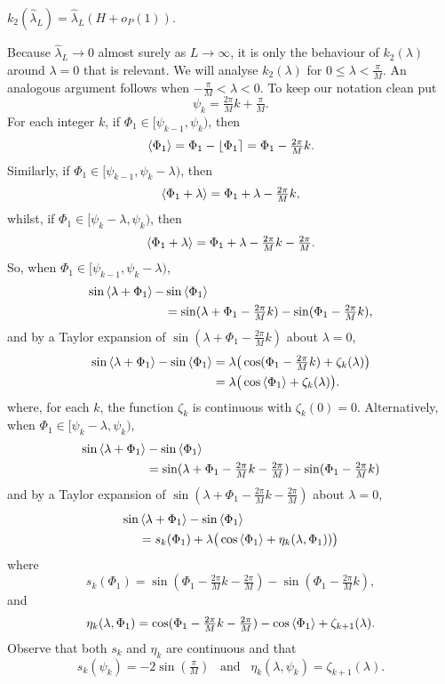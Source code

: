 \documentclass[journal]{IEEEtran}
\begin{document}
\begin{lemma}\label{lem:k2conv}
$k_2(\hat{\lambda}_L) = \hat{\lambda}_L ( H + o_P(1) ).$
\end{lemma}
\begin{IEEEproof}
Because $\hat{\lambda}_L \rightarrow 0$ almost surely as $L\rightarrow\infty$, it is only the behaviour of $k_2(\lambda)$ around $\lambda = 0$ that is relevant.  We will analyse $k_2(\lambda)$ for $0 \leq \lambda < \tfrac{\pi}{M}$.  An analogous argument follows when $-\tfrac{\pi}{M} < \lambda < 0$.  To keep our notation clean put
\[
\psi_k = \tfrac{2\pi}{M}k + \tfrac{\pi}{M}.
\]
For each integer $k$, if $\Phi_1 \in [\psi_{k-1}, \psi_k)$, then
\[
\left\langle \Phi_1 \right\rangle = \Phi_1 - {\left\lfloor \Phi_1 \right\rceil} = \Phi_1 - \tfrac{2\pi}{M}k.
\]
Similarly, if $\Phi_1 \in  [\psi_{k-1}, \psi_{k} - \lambda)$, then
\[
\left\langle \Phi_1 + \lambda \right\rangle = \Phi_1 + \lambda - \tfrac{2\pi}{M}k,
\]
whilst, if $\Phi_1 \in [\psi_{k} - \lambda, \psi_{k})$, then
\[
\left\langle \Phi_1 + \lambda \right\rangle = \Phi_1 + \lambda - \tfrac{2\pi}{M}k - \tfrac{2\pi}{M}.
\]
So, when $\Phi_1 \in [\psi_{k-1}, \psi_{k} - \lambda )$,
\begin{align*}
\sin\left\langle \lambda + \Phi_1 \right\rangle - &\sin\left\langle \Phi_1 \right\rangle \\
&= \sin(\lambda + \Phi_1 - \tfrac{2\pi}{M}k) - \sin(\Phi_1 - \tfrac{2\pi}{M}k),
\end{align*}
and by a Taylor expansion of $\sin(\lambda + \Phi_1 - \tfrac{2\pi}{M}k)$ about $\lambda = 0$, 
\begin{align*}
\sin\left\langle \lambda + \Phi_1 \right\rangle - \sin\left\langle \Phi_1 \right\rangle &= \lambda\big(\cos(\Phi_1 - \tfrac{2\pi}{M}k) + \zeta_k(\lambda)\big) \\
&= \lambda\big(\cos\left\langle \Phi_1 \right\rangle + \zeta_k(\lambda)\big).
\end{align*}
where, for each $k$, the function $\zeta_k$ is continuous with $\zeta_k(0) = 0$.  Alternatively, when $\Phi_1 \in [ \psi_{k} - \lambda,\psi_{k})$,
\begin{align*}
\sin\left\langle \lambda + \Phi_1 \right\rangle &- \sin\left\langle \Phi_1 \right\rangle \\
&= \sin(\lambda + \Phi_1 - \tfrac{2\pi}{M}k - \tfrac{2\pi}{M}) - \sin(\Phi_1 - \tfrac{2\pi}{M}k)
\end{align*}
and by a Taylor expansion of $\sin(\lambda + \Phi_1 - \tfrac{2\pi}{M}k - \tfrac{2\pi}{M})$ about $\lambda = 0$,
\begin{align*}
\sin&\left\langle \lambda + \Phi_1 \right\rangle - \sin\left\langle \Phi_1 \right\rangle \\
&= s_k(\Phi_1) + \lambda\big(\cos\left\langle \Phi_1 \right\rangle + \eta_k(\lambda, \Phi_1)  )\big)
\end{align*}
where
\[
s_k(\Phi_1) = \sin(\Phi_1 - \tfrac{2\pi}{M}k - \tfrac{2\pi}{M}) - \sin(\Phi_1 - \tfrac{2\pi}{M}k),
\]
and
\[
\eta_k(\lambda, \Phi_1) = \cos(\Phi_1 - \tfrac{2\pi}{M}k - \tfrac{2\pi}{M}) - \cos\left\langle \Phi_1 \right\rangle + \zeta_{k+1}(\lambda).
\]
Observe that both $s_k$ and $\eta_k$ are continuous and that 
\[
s_k(\psi_{k}) = -2\sin(\tfrac{\pi}{M}) \;\;\; \text{and} \;\;\; \eta_k(\lambda,\psi_k) = \zeta_{k+1}(\lambda).
\]


\end{IEEEproof}
\end{document}

